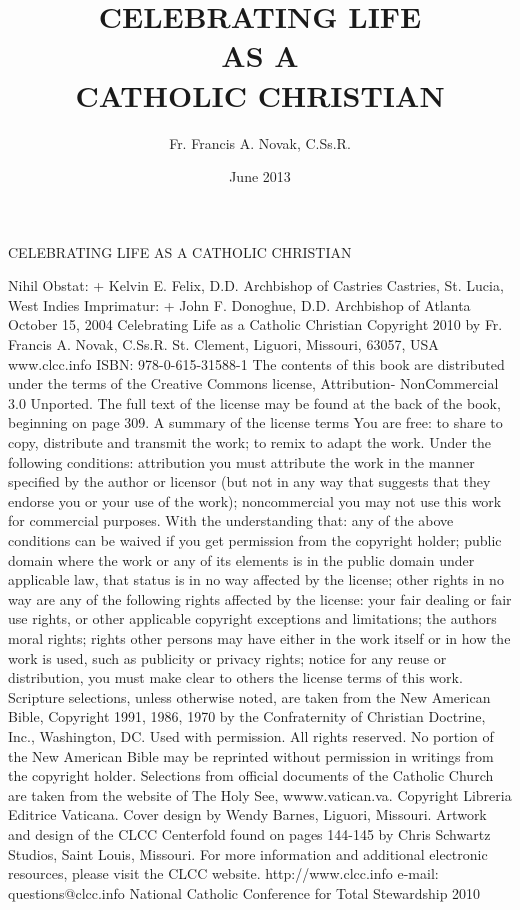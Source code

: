 \documentclass[oneside]{book}
\title{\textbf{CELEBRATING LIFE} \\ AS A \\ \textbf{CATHOLIC CHRISTIAN}}
\author{Fr. Francis A. Novak, C.Ss.R.}  \date{June 2013}
\begin{document}
\pagestyle{plain}


\frontmatter

\setcounter{secnumdepth}{-1}
\section*{} 

CELEBRATING LIFE AS A CATHOLIC CHRISTIAN


Nihil Obstat: + Kelvin E. Felix, D.D. Archbishop of Castries Castries,
St. Lucia, West Indies Imprimatur: + John F. Donoghue, D.D. Archbishop of
Atlanta October 15, 2004 Celebrating Life as a Catholic Christian Copyright
2010 by Fr. Francis A. Novak, C.Ss.R. St. Clement, Liguori, Missouri, 63057, USA
www.clcc.info ISBN: 978-0-615-31588-1 The contents of this book are distributed
under the terms of the Creative Commons license, Attribution- NonCommercial 3.0
Unported. The full text of the license may be found at the back of the book,
beginning on page 309.  A summary of the license terms You are free: to share
to copy, distribute and transmit the work; to remix  to adapt the work. Under
the following conditions: attribution  you must attribute the work in the manner
specified by the author or licensor (but not in any way that suggests that they
endorse you or your use of the work); noncommercial you may not use this work
for commercial purposes. With the understanding that: any of the above
conditions can be waived if you get permission from the copyright holder; public
domain  where the work or any of its elements is in the public domain under
applicable law, that status is in no way affected by the license; other rights
in no way are any of the following rights affected by the license: your fair
dealing or fair use rights, or other applicable copyright exceptions and
limitations; the authors moral rights; rights other persons may have either in
the work itself or in how the work is used, such as publicity or privacy rights;
notice  for any reuse or distribution, you must make clear to others the license
terms of this work.  Scripture selections, unless otherwise noted, are taken
from the New American Bible, Copyright  1991, 1986, 1970 by the Confraternity of
Christian Doctrine, Inc., Washington, DC. Used with permission. All rights
reserved. No portion of the New American Bible may be reprinted without
permission in writings from the copyright holder.  Selections from official
documents of the Catholic Church are taken from the website of The Holy See,
wwww.vatican.va. Copyright Libreria Editrice Vaticana.  Cover design by Wendy
Barnes, Liguori, Missouri. Artwork and design of the CLCC Centerfold found on
pages 144-145 by Chris Schwartz Studios, Saint Louis, Missouri.  For more
information and additional electronic resources, please visit the CLCC website.
http://www.clcc.info e-mail: questions@clcc.info National Catholic Conference
for Total Stewardship 2010
\end{document}
